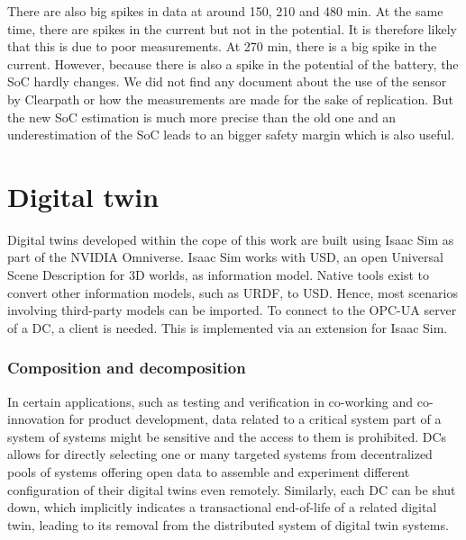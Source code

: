 \documentclass[conference]{IEEEtran}
\begin{document}
There are also big spikes in  data at around 150, 210 and 480 min.
At the same time, there are spikes in the current but not in the potential.
It is therefore likely that this is due to poor measurements.
At 270 min, there is  a big spike in the current. However, because there is also a spike in the potential of the battery, the  SoC hardly changes.
We did not find any document about the use of the sensor by Clearpath or how the measurements are made for the sake of replication.
But the new SoC estimation is much more precise than the old one and an underestimation of the SoC leads to an bigger safety margin which is also useful.
\section{Digital twin}
Digital twins developed within the cope of this work are built using Isaac Sim as part of the NVIDIA Omniverse. Isaac Sim works with USD, an open Universal Scene Description for 3D worlds, as information model. Native tools exist  to convert other information models, such as URDF, to USD. Hence, most scenarios involving third-party models can be  imported. To connect to the OPC-UA server of a DC, a client is needed. This is implemented via an extension for Isaac Sim.
\subsubsection{Composition and decomposition}
In certain applications, such as testing and verification in co-working and co-innovation for product development, data related to a critical system part of a system of systems might be sensitive and the access to them is prohibited.  DCs allows for directly selecting one or many targeted systems from  decentralized pools of systems offering open data to assemble and experiment different configuration of their digital twins even remotely. Similarly, each  DC can be shut down, which implicitly  indicates a transactional end-of-life of a related digital twin,  leading to its removal from the distributed system of digital twin systems.  %

\end{document}
